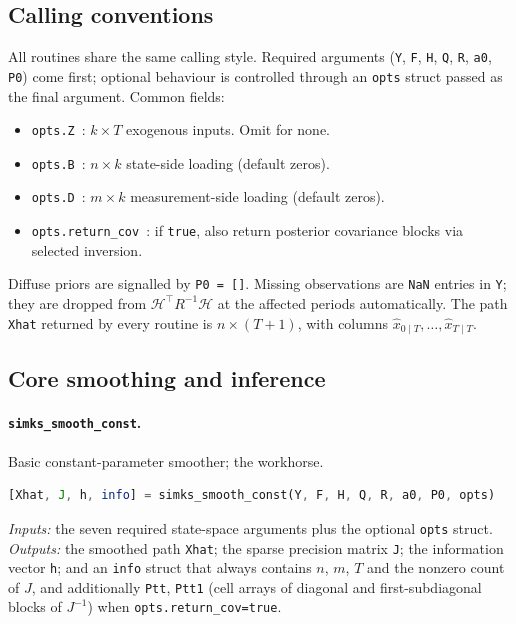 \documentclass[11pt]{article}
\begin{document}
\subsection{Calling conventions}

All routines share the same calling style.  Required arguments
(\texttt{Y}, \texttt{F}, \texttt{H}, \texttt{Q}, \texttt{R},
\texttt{a0}, \texttt{P0}) come first; optional behaviour is controlled
through an \texttt{opts} struct passed as the final argument.  Common
fields:
\begin{itemize}[leftmargin=2em,itemsep=2pt]
\item \texttt{opts.Z}\ : $k\times T$ exogenous inputs.  Omit for none.
\item \texttt{opts.B}\ : $n\times k$ state-side loading (default zeros).
\item \texttt{opts.D}\ : $m\times k$ measurement-side loading (default zeros).
\item \texttt{opts.return\_cov}\ : if \texttt{true}, also return posterior covariance blocks via selected inversion.
\end{itemize}
Diffuse priors are signalled by \texttt{P0 = []}.  Missing
observations are \texttt{NaN} entries in \texttt{Y}; they are dropped
from $\mathcal H^\top R^{-1}\mathcal H$ at the affected periods
automatically.  The path \texttt{Xhat} returned by every routine is
$n\times(T+1)$, with columns $\widehat x_{0\mid T},\ldots,
\widehat x_{T\mid T}$.

\subsection{Core smoothing and inference}

\paragraph{\texttt{simks\_smooth\_const}.}  Basic constant-parameter
smoother; the workhorse.
\begin{lstlisting}[language=Octave]
[Xhat, J, h, info] = simks_smooth_const(Y, F, H, Q, R, a0, P0, opts)
\end{lstlisting}
\emph{Inputs:} the seven required state-space arguments plus the
optional \texttt{opts} struct.  \emph{Outputs:} the smoothed path
\texttt{Xhat}; the sparse precision matrix \texttt{J}; the
information vector \texttt{h}; and an \texttt{info} struct that
always contains $n$, $m$, $T$ and the nonzero count of $J$, and
additionally \texttt{Ptt}, \texttt{Ptt1} (cell arrays of diagonal and
first-subdiagonal blocks of $J^{-1}$) when
\texttt{opts.return\_cov=true}.
\end{document}
